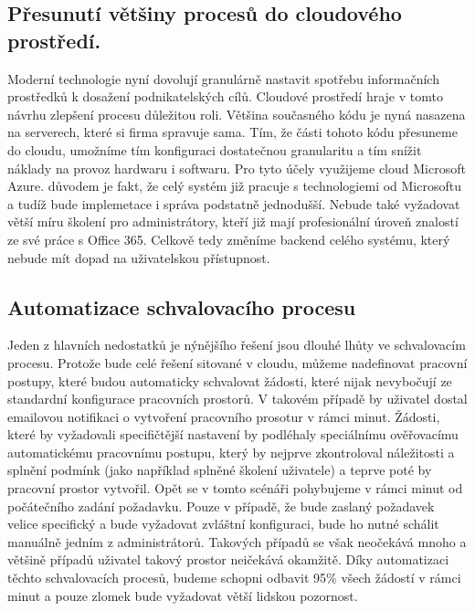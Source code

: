 \documentclass[12pt]{article}
\begin{document}
\begin{sloppypar}
\begin{spacing}{1.15}
        \subsection*{Přesunutí většiny procesů do cloudového prostředí.}
        Moderní technologie nyní dovolují granulárně nastavit spotřebu
        informačních prostředků k dosažení podnikatelských cílů. Cloudové
        prostředí hraje v tomto návrhu zlepšení procesu důležitou roli. Většina
        současného kódu je nyná nasazena na serverech, které si firma spravuje
        sama. Tím, že části tohoto kódu přesuneme do cloudu, umožníme tím
        konfiguraci dostatečnou granularitu a tím snížit náklady na provoz
        hardwaru i softwaru. Pro tyto účely využijeme cloud Microsoft Azure.
        důvodem je fakt, že celý systém již pracuje s  technologiemi od
        Microsoftu a tudíž bude implemetace i správa podstatně jednodušší.
        Nebude také vyžadovat větší míru školení pro administrátory, kteří již
        mají profesionální úroveň znalostí ze své práce s Office 365. Celkově
        tedy změníme backend celého systému, který nebude mít dopad na
        uživatelskou přístupnost.
        
        \subsection*{Automatizace schvalovacího procesu}
        Jeden z hlavních nedostatků je nýnějšího řešení jsou dlouhé lhůty ve
        schvalovacím procesu. Protože bude celé řešení sitované v cloudu, můžeme
        nadefinovat pracovní postupy, které budou automaticky schvalovat
        žádosti, které nijak nevybočují ze standardní konfigurace pracovních
        prostorů. V takovém případě by uživatel dostal emailovou notifikaci o
        vytvoření pracovního prosotur v rámci minut. Žádosti, které by
        vyžadovali specifičtější nastavení by podléhaly speciálnímu ověřovacímu
        automatickému pracovnímu postupu, který by nejprve zkontroloval
        náležitosti a splnění podmínk (jako například splněné školení uživatele)
        a teprve poté by pracovní prostor vytvořil. Opět se v tomto scénáři
        pohybujeme v rámci minut od počátečního zadání požadavku. Pouze v
        případě, že bude zaslaný požadavek velice specifický a bude vyžadovat
        zvláštní konfiguraci, bude ho nutné schálit manuálně jedním z
        administrátorů. Takových případů se však neočekává mnoho a většině
        případů uživatel takový prostor neičekává okamžitě. Díky automatizaci
        těchto schvalovacích procesů, budeme schopni odbavit 95\% všech žádostí
        v rámci minut a pouze zlomek bude vyžadovat větší lidskou pozornost.


\end{spacing}
\end{sloppypar}
\end{document}
